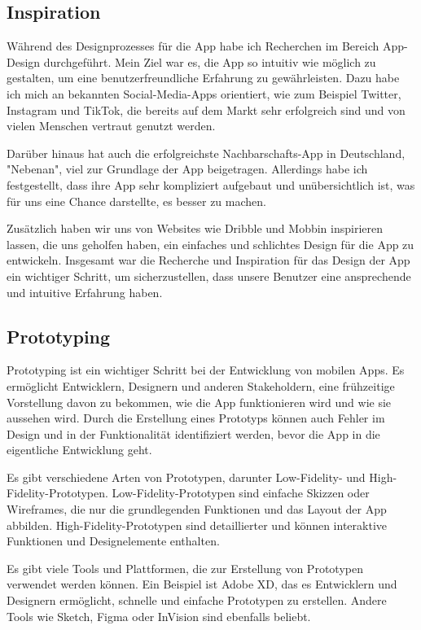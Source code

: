 \subsection{Inspiration}
Während des Designprozesses für die App habe ich Recherchen im Bereich App-Design durchgeführt. Mein Ziel war es, die App so intuitiv wie möglich zu gestalten, um eine benutzerfreundliche Erfahrung zu gewährleisten. Dazu habe ich mich an bekannten Social-Media-Apps orientiert, wie zum Beispiel Twitter, Instagram und TikTok, die bereits auf dem Markt sehr erfolgreich sind und von vielen Menschen vertraut genutzt werden.

Darüber hinaus hat auch die erfolgreichste Nachbarschafts-App in Deutschland, "Nebenan", viel zur Grundlage der App beigetragen. Allerdings habe ich festgestellt, dass ihre App sehr kompliziert aufgebaut und unübersichtlich ist, was für uns eine Chance darstellte, es besser zu machen.

Zusätzlich haben wir uns von Websites wie Dribble und Mobbin inspirieren lassen, die uns geholfen haben, ein einfaches und schlichtes Design für die App zu entwickeln. Insgesamt war die Recherche und Inspiration für das Design der App ein wichtiger Schritt, um sicherzustellen, dass unsere Benutzer eine ansprechende und intuitive Erfahrung haben.

\subsection{Prototyping}
Prototyping ist ein wichtiger Schritt bei der Entwicklung von mobilen Apps. Es ermöglicht Entwicklern, Designern und anderen Stakeholdern, eine frühzeitige Vorstellung davon zu bekommen, wie die App funktionieren wird und wie sie aussehen wird. Durch die Erstellung eines Prototyps können auch Fehler im Design und in der Funktionalität identifiziert werden, bevor die App in die eigentliche Entwicklung geht.

Es gibt verschiedene Arten von Prototypen, darunter Low-Fidelity- und High-Fidelity-Prototypen. Low-Fidelity-Prototypen sind einfache Skizzen oder Wireframes, die nur die grundlegenden Funktionen und das Layout der App abbilden. High-Fidelity-Prototypen sind detaillierter und können interaktive Funktionen und Designelemente enthalten.

Es gibt viele Tools und Plattformen, die zur Erstellung von Prototypen verwendet werden können. Ein Beispiel ist Adobe XD, das es Entwicklern und Designern ermöglicht, schnelle und einfache Prototypen zu erstellen. Andere Tools wie Sketch, Figma oder InVision sind ebenfalls beliebt.

